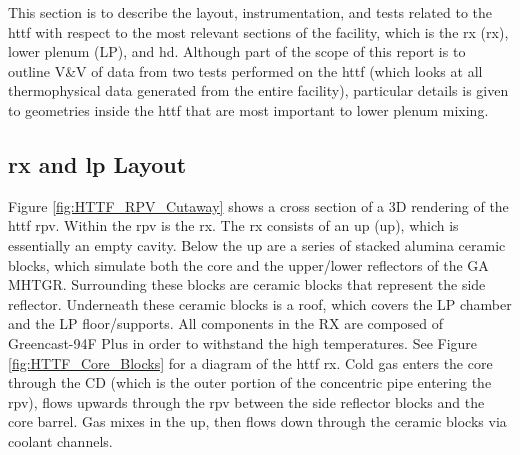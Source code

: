 \documentclass[double,12pt]{beavtex}
\begin{document}
This section is to describe the layout, instrumentation, and tests related to the \acrshort{httf} with respect to the most relevant sections of the facility, which is the \acrlong{rx} (\acrshort{rx}), lower plenum (LP), and \acrshort{hd}. Although part of the scope of this report is to outline V\&V of data from two tests performed on the \acrshort{httf} (which looks at all thermophysical data generated from the entire facility), particular details is given to geometries inside the \acrshort{httf} that are most important to lower plenum mixing. 

\subsection{\acrshort{rx} and \acrshort{lp} Layout}

Figure \ref{fig:HTTF_RPV_Cutaway} shows a cross section of a 3D rendering of the \acrshort{httf} \acrshort{rpv}. Within the \acrshort{rpv} is the \acrshort{rx}. The \acrshort{rx} consists of an \acrlong{up} (\acrshort{up}), which is essentially an empty cavity. Below the \acrshort{up} are a series of stacked alumina ceramic blocks, which simulate both the core and the upper/lower reflectors of the GA MHTGR. Surrounding these blocks are ceramic blocks that represent the side reflector. Underneath these ceramic blocks is a roof, which covers the LP chamber and the LP floor/supports. All components in the RX are composed of Greencast-94F Plus  in order to withstand the high temperatures. See Figure \ref{fig:HTTF_Core_Blocks} for a diagram of the \acrshort{httf} \acrshort{rx}. Cold gas enters the core through the CD (which is the outer portion of the concentric pipe entering the \acrshort{rpv}), flows upwards through the \acrshort{rpv} between the side reflector blocks and the core barrel. Gas mixes in the \acrshort{up}, then flows down through the ceramic blocks via coolant channels.
\end{document}

